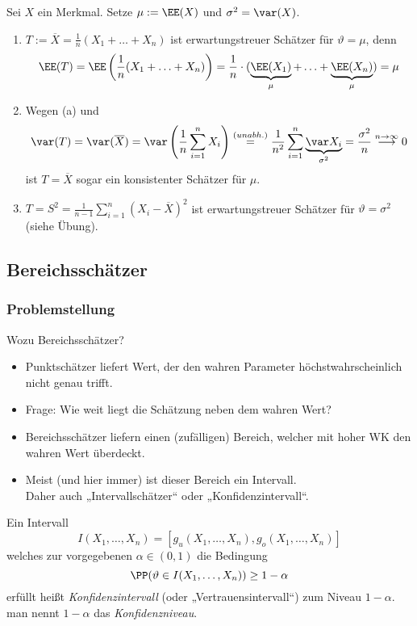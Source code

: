 \documentclass{scrreprt}
\renewenvironment{anumerate}{\begin{enumerate}[label=(\alph*)]}{\end{enumerate}} %
\begin{document}
 Sei $X$ ein Merkmal. Setze $\mu := \EE(X)$ und $\sigma ^2 = \var (X)$.
\begin{anumerate}
\item $T:= \overline{X} = \frac{1}{n} (X_1+\ldots + X_n)$ ist erwartungstreuer Schätzer für $\vartheta = \mu$, denn
$$\EE(T)=\EE \left( \frac{1}{n} (X_1+\ldots + X_n) \right)=\frac{1}{n}\cdot (\underbrace{\EE(X_1)}_{\mu}+\ldots + \underbrace{\EE(X_n)}_{\mu})=\mu $$
\item Wegen (a) und 
$$\var (T)=\var (\overline{X}) = \var \left( \frac{1}{n} \sum_{i=1}^n X_i\right) \overset{(unabh.)}{=}\frac{1}{n^2}\sum_{i=1}^n \underbrace{\var X_i}_{\sigma^2} = \frac{\sigma^2}{n} \overset{n\to \infty}{\longrightarrow} 0$$
ist $T=\overline{X}$ sogar ein konsistenter Schätzer für $\mu$.
\item $T=S^2 = \frac{1}{n-1}\sum_{i=1}^n (X_i-\overline{X})^2$ ist erwartungstreuer Schätzer für $\vartheta = \sigma^2$ (siehe Übung).
\end{anumerate}

\subsection{Bereichsschätzer}

\subsubsection{Problemstellung}

Wozu Bereichsschätzer?
\begin{itemize}
\item Punktschätzer liefert Wert, der den wahren Parameter höchstwahrscheinlich nicht genau trifft.
\item Frage: Wie weit liegt die Schätzung neben dem wahren Wert?
\item Bereichsschätzer liefern einen (zufälligen) Bereich, welcher mit hoher WK den wahren Wert überdeckt.
\item Meist (und hier immer) ist dieser Bereich ein Intervall.\\
Daher auch „Intervallschätzer“ oder „Konfidenzintervall“.
\end{itemize}

 Ein Intervall
$$I(X_1, \ldots, X_n) =[g_u (X_1, \ldots, X_n), g_o(X_1, \ldots, X_n)]$$
welches zur vorgegebenen $\alpha \in (0,1)$ die Bedingung
$$\PP(\vartheta \in I(X_1, \ldots, X_n)) \geq 1-\alpha$$
erfüllt heißt \emph{Konfidenzintervall} (oder „Vertrauensintervall“) zum Niveau $1-\alpha$. man nennt $1-\alpha$ das \emph{Konfidenzniveau}.
\end{document}
